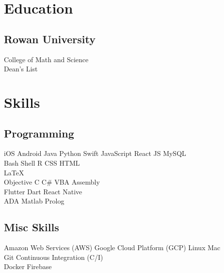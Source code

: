 \documentclass[]{johns_resume_style}
\begin{document}
\begin{minipage}[t]{0.31\textwidth} 


\section{Education} 

\subsection{Rowan University}
\sectionsep

College of Math and Science \\
Dean's List \\
\sectionsep





\section{Skills}
\subsection{Programming}
    iOS \textbullet{} Android \textbullet{} Java  \textbullet{} Python \textbullet{} Swift 
    JavaScript \textbullet{} React JS  \textbullet{} MySQL \\ 
    Bash Shell    \textbullet{} R  \textbullet{} CSS \textbullet{} HTML \\
    LaTeX\ \\ 
     Objective C \textbullet{} C\#  \textbullet{} VBA \textbullet{} Assembly \\
    Flutter  \textbullet{} Dart \textbullet{} React Native \\
    ADA \textbullet{} Matlab \textbullet{} Prolog
\sectionsep

\subsection{Misc Skills}
Amazon Web Services (AWS) \textbullet{} Google Cloud Platform (GCP)   \textbullet{} Linux \textbullet{} Mac  \\
Git  
\textbullet{} Continuous Integration (C/I)  \\ 
Docker  \textbullet{}Firebase 



\end{minipage}
\end{document}
